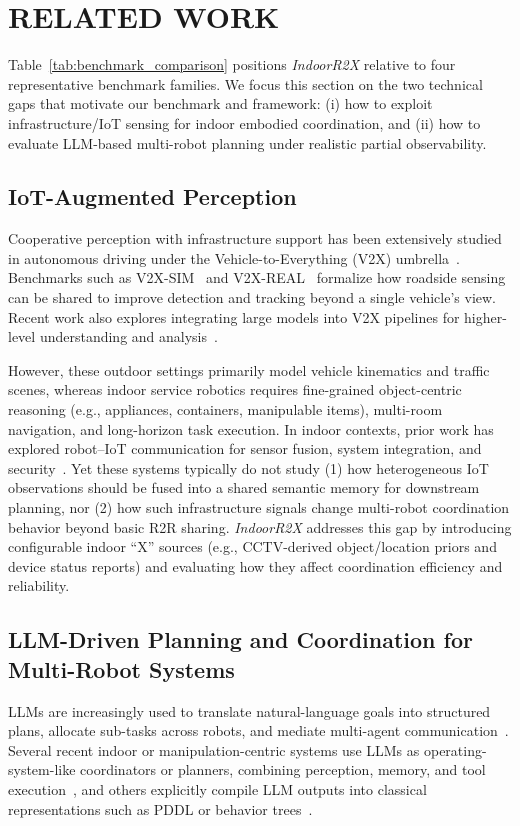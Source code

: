 \section{RELATED WORK}
\label{sec:related_work}

Table~\ref{tab:benchmark_comparison} positions \textit{IndoorR2X} relative to four representative benchmark families. We focus this section on the two technical gaps that motivate our benchmark and framework: (i) how to exploit infrastructure/IoT sensing for indoor embodied coordination, and (ii) how to evaluate LLM-based multi-robot planning under realistic partial observability.

\subsection{IoT-Augmented Perception}
Cooperative perception with infrastructure support has been extensively studied in autonomous driving under the Vehicle-to-Everything (V2X) umbrella~\cite{yusuf2024vehicle, v2x_1}. Benchmarks such as V2X-SIM~\cite{li2022v2x} and V2X-REAL~\cite{xiang2024v2x} formalize how roadside sensing can be shared to improve detection and tracking beyond a single vehicle’s view. Recent work also explores integrating large models into V2X pipelines for higher-level understanding and analysis~\cite{wang2023accidentgpt, mahmud2025integrating, wu2025v2x}.

However, these outdoor settings primarily model vehicle kinematics and traffic scenes, whereas indoor service robotics requires fine-grained object-centric reasoning (e.g., appliances, containers, manipulable items), multi-room navigation, and long-horizon task execution. In indoor contexts, prior work has explored robot--IoT communication for sensor fusion, system integration, and security~\cite{farnham2021umbrella, tashtoush2021enhancing, krzykowska2021secure, aroulanandam2022sensor, romeo2020internet}. Yet these systems typically do not study 
(1) how heterogeneous IoT observations should be fused into a shared semantic memory for downstream planning, nor
(2) how such infrastructure signals change multi-robot coordination behavior beyond basic R2R sharing.
\textit{IndoorR2X} addresses this gap by introducing configurable indoor ``X'' sources (e.g., CCTV-derived object/location priors and device status reports) and evaluating how they affect coordination efficiency and reliability.

\subsection{LLM-Driven Planning and Coordination for Multi-Robot Systems}
LLMs are increasingly used to translate natural-language goals into structured plans, allocate sub-tasks across robots, and mediate multi-agent communication~\cite{li2025large, lykov2023llm, mandi2024roco, zhang2025lamma}. Several recent indoor or manipulation-centric systems use LLMs as operating-system-like coordinators or planners, combining perception, memory, and tool execution~\cite{chen2025emos, liu2025coherent, song2025collabot, zhu2025dexter}, and others explicitly compile LLM outputs into classical representations such as PDDL or behavior trees~\cite{kannan2024smart, bai2024twostep}.

